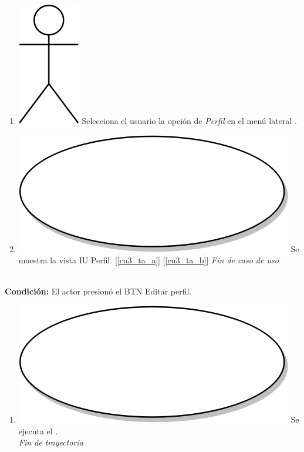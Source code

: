 \begin{enumerate}
\item {\includegraphics[scale=.1]{Capitulo3/img/actor.png} Selecciona el usuario la opción de \textit{Perfil} en el menú lateral \textbf{}.}
\item {\includegraphics[scale=.05]{Capitulo3/img/proceso.png} Se muestra la vista IU Perfil. [\ref{cu3_ta_a}] [\ref{cu3_ta_b}]}
  \textit{Fin de caso de uso} \\  
\end{enumerate}

\textbf{} \\
\textbf{Condición:} El actor presionó el BTN Editar perfil. \\
 \begin{enumerate}[label=A\arabic*]
    \item {\includegraphics[scale=.05]{Capitulo3/img/proceso.png} Se ejecuta el \textbf{}.} \\
    \textit{Fin de trayectoria} \\
\end{enumerate}

